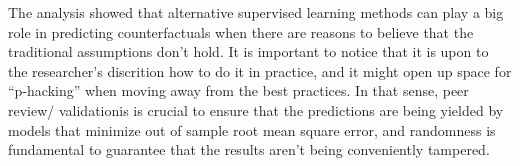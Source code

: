 \documentclass[
]{article}
\begin{document}
The analysis showed that alternative supervised learning methods can
play a big role in predicting counterfactuals when there are reasons to
believe that the traditional assumptions don't hold. It is important to
notice that it is upon to the researcher's discrition how to do it in
practice, and it might open up space for ``p-hacking'' when moving away
from the best practices. In that sense, peer review/ validationis is
crucial to ensure that the predictions are being yielded by models that
minimize out of sample root mean square error, and randomness is
fundamental to guarantee that the results aren't being conveniently
tampered.
\end{document}
